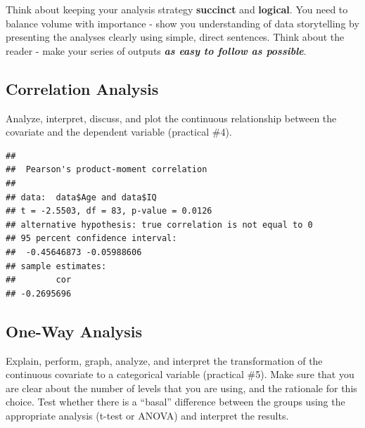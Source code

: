\documentclass[
]{book}
\newenvironment{Shaded}{\begin{snugshade}}{\end{snugshade}}
\newcommand{\AttributeTok}[1]{\textcolor[rgb]{0.13,0.29,0.53}{#1}}
\newcommand{\CommentTok}[1]{\textcolor[rgb]{0.56,0.35,0.01}{\textit{#1}}}
\newcommand{\ConstantTok}[1]{\textcolor[rgb]{0.56,0.35,0.01}{#1}}
\newcommand{\DecValTok}[1]{\textcolor[rgb]{0.00,0.00,0.81}{#1}}
\newcommand{\FunctionTok}[1]{\textcolor[rgb]{0.13,0.29,0.53}{\textbf{#1}}}
\newcommand{\NormalTok}[1]{#1}
\newcommand{\OtherTok}[1]{\textcolor[rgb]{0.56,0.35,0.01}{#1}}
\newcommand{\SpecialCharTok}[1]{\textcolor[rgb]{0.81,0.36,0.00}{\textbf{#1}}}
\newcommand{\StringTok}[1]{\textcolor[rgb]{0.31,0.60,0.02}{#1}}
\begin{document}
Think about keeping your analysis strategy \textbf{succinct} and \textbf{logical}. You need to balance volume with importance - show you understanding of data storytelling by presenting the analyses clearly using simple, direct sentences. Think about the reader - make your series of outputs \textbf{\emph{as easy to follow as possible}}.

\subsection*{Correlation Analysis}\label{correlation-analysis}

Analyze, interpret, discuss, and plot the continuous relationship between the covariate and the dependent variable (practical \#4).

\begin{Shaded}
\end{Shaded}

\begin{verbatim}
## 
##  Pearson's product-moment correlation
## 
## data:  data$Age and data$IQ
## t = -2.5503, df = 83, p-value = 0.0126
## alternative hypothesis: true correlation is not equal to 0
## 95 percent confidence interval:
##  -0.45646873 -0.05988606
## sample estimates:
##        cor 
## -0.2695696
\end{verbatim}

\subsection*{One-Way Analysis}\label{one-way-analysis}

Explain, perform, graph, analyze, and interpret the transformation of the continuous covariate to a categorical variable (practical \#5). Make sure that you are clear about the number of levels that you are using, and the rationale for this choice. Test whether there is a ``basal'' difference between the groups using the appropriate analysis (t-test or ANOVA) and interpret the results.

\begin{Shaded}
\end{Shaded}
\end{document}
